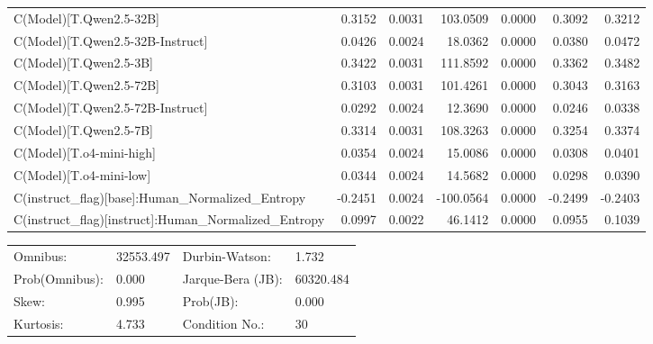 \documentclass{article} %
\begin{document}
\begin{table}
\begin{center}
\begin{tabular}{lrrrrrr}
C(Model)[T.Qwen2.5-32B]                                &  0.3152 &   0.0031 &  103.0509 &      0.0000 &  0.3092 &  0.3212  \\
C(Model)[T.Qwen2.5-32B-Instruct]                       &  0.0426 &   0.0024 &   18.0362 &      0.0000 &  0.0380 &  0.0472  \\
C(Model)[T.Qwen2.5-3B]                                 &  0.3422 &   0.0031 &  111.8592 &      0.0000 &  0.3362 &  0.3482  \\
C(Model)[T.Qwen2.5-72B]                                &  0.3103 &   0.0031 &  101.4261 &      0.0000 &  0.3043 &  0.3163  \\
C(Model)[T.Qwen2.5-72B-Instruct]                       &  0.0292 &   0.0024 &   12.3690 &      0.0000 &  0.0246 &  0.0338  \\
C(Model)[T.Qwen2.5-7B]                                 &  0.3314 &   0.0031 &  108.3263 &      0.0000 &  0.3254 &  0.3374  \\
C(Model)[T.o4-mini-high]                               &  0.0354 &   0.0024 &   15.0086 &      0.0000 &  0.0308 &  0.0401  \\
C(Model)[T.o4-mini-low]                                &  0.0344 &   0.0024 &   14.5682 &      0.0000 &  0.0298 &  0.0390  \\
C(instruct\_flag)[base]:Human\_Normalized\_Entropy     & -0.2451 &   0.0024 & -100.0564 &      0.0000 & -0.2499 & -0.2403  \\
C(instruct\_flag)[instruct]:Human\_Normalized\_Entropy &  0.0997 &   0.0022 &   46.1412 &      0.0000 &  0.0955 &  0.1039  \\
\hline
\end{tabular}
\end{center}
\begin{center}
\begin{tabular}{llll}
\hline
Omnibus:       & 32553.497 & Durbin-Watson:    & 1.732      \\
Prob(Omnibus): & 0.000     & Jarque-Bera (JB): & 60320.484  \\
Skew:          & 0.995     & Prob(JB):         & 0.000      \\
Kurtosis:      & 4.733     & Condition No.:    & 30         \\
\hline
\end{tabular}
\end{center}
\end{table}
\end{document}
